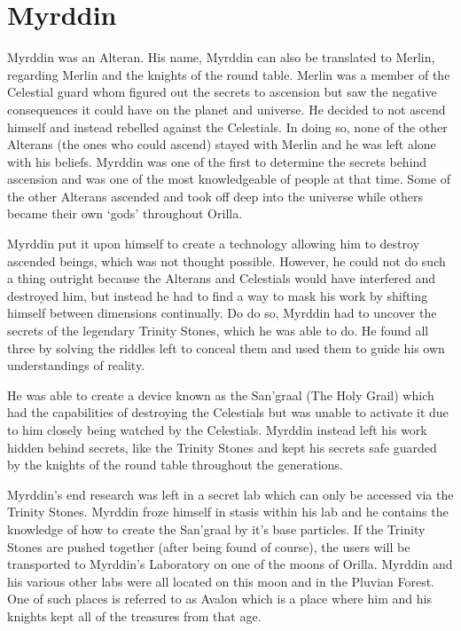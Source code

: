 \section{Myrddin}

Myrddin was an Alteran. His name, Myrddin can also be translated to Merlin, regarding Merlin and the knights of the round table. Merlin was a member of the Celestial guard whom figured out the secrets to ascension but saw the negative consequences it could have on the planet and universe. He decided to not ascend himself and instead rebelled against the Celestials. In doing so, none of the other Alterans (the ones who could ascend) stayed with Merlin and he was left alone with his beliefs. Myrddin was one of the first to determine the secrets behind ascension and was one of the most knowledgeable of people at that time. Some of the other Alterans ascended and took off deep into the universe while others became their own `gods' throughout Orilla.

Myrddin put it upon himself to create a technology allowing him to destroy ascended beings, which was not thought possible. However, he could not do such a thing outright because the Alterans and Celestials would have interfered and destroyed him, but instead he had to find a way to mask his work by shifting himself between dimensions continually. Do do so, Myrddin had to uncover the secrets of the legendary Trinity Stones, which he was able to do. He found all three by solving the riddles left to conceal them and used them to guide his own understandings of reality.

He was able to create a device known as the San'graal (The Holy Grail) which had the capabilities of destroying the Celestials but was unable to activate it due to him closely being watched by the Celestials. Myrddin instead left his work hidden behind secrets, like the Trinity Stones and kept his secrets safe guarded by the knights of the round table throughout the generations.

Myrddin's end research was left in a secret lab which can only be accessed via the Trinity Stones. Myrddin froze himself in stasis within his lab and he contains the knowledge of how to create the San'graal by it's base particles. If the Trinity Stones are pushed together (after being found of course), the users will be transported to Myrddin's Laboratory on one of the moons of Orilla. Myrddin and his various other labs were all located on this moon and in the Pluvian Forest. One of such places is referred to as Avalon which is a place where him and his knights kept all of the treasures from that age.

